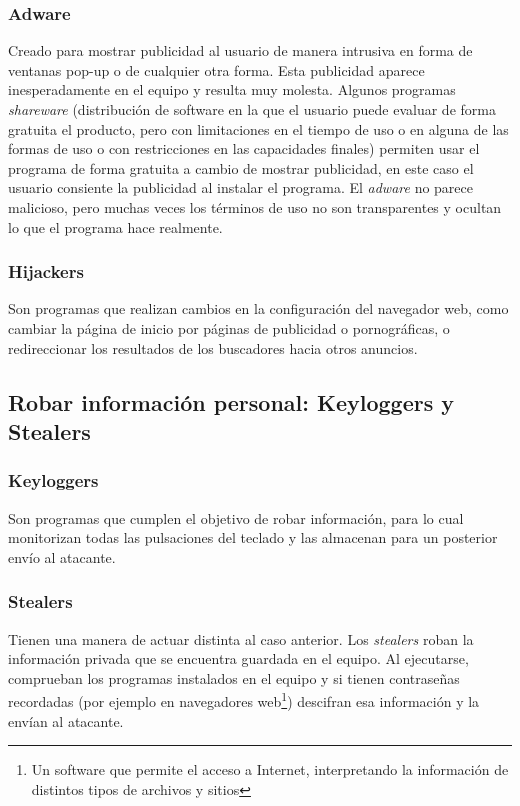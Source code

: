 \subsubsection{Adware} Creado para mostrar publicidad al usuario de manera intrusiva en forma de ventanas pop-up o de cualquier otra forma. Esta publicidad aparece inesperadamente en el equipo y resulta muy molesta. Algunos programas \textit{shareware} (distribución de software en la que el usuario puede evaluar de forma gratuita el producto, pero con limitaciones en el tiempo de uso o en alguna de las formas de uso o con restricciones en las capacidades finales) permiten usar el programa de forma gratuita a cambio de mostrar publicidad, en este caso el usuario consiente la publicidad al instalar el programa. El \textit{adware} no parece malicioso, pero muchas veces los términos de uso no son transparentes y ocultan lo que el programa hace realmente.

\subsubsection{Hijackers} Son programas que realizan cambios en la configuración del navegador web, como cambiar la página de inicio por páginas de publicidad o pornográficas, o redireccionar los resultados de los buscadores hacia otros anuncios.

\subsection{Robar información personal: Keyloggers y Stealers}
\subsubsection{Keyloggers} Son programas que cumplen el objetivo de robar información, para lo cual monitorizan todas las pulsaciones del teclado y las almacenan para un posterior envío al atacante.

\subsubsection{Stealers} Tienen una manera de actuar distinta al caso anterior. Los \textit{stealers} roban la información privada que se encuentra guardada en el equipo. Al ejecutarse, comprueban los programas instalados en el equipo y si tienen contraseñas recordadas (por ejemplo en navegadores web\footnote{Un software que permite el acceso a Internet, interpretando la información de distintos tipos de archivos y sitios}) descifran esa información y la envían al atacante.

